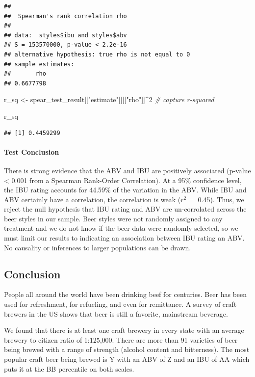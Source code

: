 \documentclass[]{article}
\newenvironment{Shaded}{\begin{snugshade}}{\end{snugshade}}
\newcommand{\DecValTok}[1]{\textcolor[rgb]{0.00,0.00,0.81}{#1}}
\newcommand{\StringTok}[1]{\textcolor[rgb]{0.31,0.60,0.02}{#1}}
\newcommand{\CommentTok}[1]{\textcolor[rgb]{0.56,0.35,0.01}{\textit{#1}}}
\newcommand{\OperatorTok}[1]{\textcolor[rgb]{0.81,0.36,0.00}{\textbf{#1}}}
\newcommand{\NormalTok}[1]{#1}
\let\oldparagraph\paragraph
\renewcommand{\paragraph}[1]{\oldparagraph{#1}\mbox{}}
\begin{document}
\begin{verbatim}
## 
##  Spearman's rank correlation rho
## 
## data:  styles$ibu and styles$abv
## S = 153570000, p-value < 2.2e-16
## alternative hypothesis: true rho is not equal to 0
## sample estimates:
##       rho 
## 0.6677798
\end{verbatim}

\begin{Shaded}
\begin{Highlighting}[]
\NormalTok{r_sq <-}\StringTok{ }\NormalTok{spear_test_result[[}\StringTok{"estimate"}\NormalTok{]][[}\StringTok{"rho"}\NormalTok{]]}\OperatorTok{^}\DecValTok{2} \CommentTok{# capture r-squared}

\NormalTok{r_sq}
\end{Highlighting}
\end{Shaded}

\begin{verbatim}
## [1] 0.4459299
\end{verbatim}

\paragraph{Test Conclusion}\label{test-conclusion}

There is strong evidence that the ABV and IBU are positively associated
(p-value \textless{} 0.001 from a Spearman Rank-Order Correlation). At a
95\% confidence level, the IBU rating accounts for 44.59\% of the
variation in the ABV. While IBU and ABV certainly have a correlation,
the correlation is weak (\(r^2 =\) 0.45). Thus, we reject the null
hypothesis that IBU rating and ABV are un-corrolated across the beer
styles in our sample. Beer styles were not randomly assigned to any
treatment and we do not know if the beer data were randomly selected, so
we must limit our results to indicating an association between IBU
rating an ABV. No causality or inferences to larger populations can be
drawn.

\subsection{Conclusion}\label{conclusion}

People all around the world have been drinking beef for centuries. Beer
has been used for refreshment, for refueling, and even for remittance. A
survey of craft brewers in the US shows that beer is still a favorite,
mainstream beverage.

We found that there is at least one craft brewery in every state with an
average brewery to citizen ratio of 1:125,000. There are more than 91
varieties of beer being brewed with a range of strength (alcohol content
and bitterness). The most popular craft beer being brewed is Y with an
ABV of Z and an IBU of AA which puts it at the BB percentile on both
scales.
\end{document}
